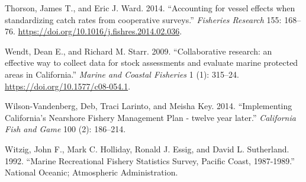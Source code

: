 \documentclass[11pt,
  english,
  a4paper,
]{article}
\newlength{\cslhangindent}
\newenvironment{CSLReferences}[2] %
 {%
  \setlength{\parindent}{0pt}
  \ifodd #1 \everypar{\setlength{\hangindent}{\cslhangindent}}\ignorespaces\fi
  \ifnum #2 > 0
  \setlength{\parskip}{#2\baselineskip}
  \fi
 }%
 {}
\begin{document}
\begin{CSLReferences}{1}{0}
\leavevmode{}%
Thorson, James T., and Eric J. Ward. 2014. {``{Accounting for vessel effects when standardizing catch rates from cooperative surveys}.''} \emph{Fisheries Research} 155: 168--76. \url{https://doi.org/10.1016/j.fishres.2014.02.036}.

\leavevmode{}%
Wendt, Dean E., and Richard M. Starr. 2009. {``{Collaborative research: an effective way to collect data for stock assessments and evaluate marine protected areas in California}.''} \emph{Marine and Coastal Fisheries} 1 (1): 315--24. \url{https://doi.org/10.1577/c08-054.1}.

\leavevmode{}%
Wilson-Vandenberg, Deb, Traci Larinto, and Meisha Key. 2014. {``{Implementing California's Nearshore Fishery Management Plan - twelve year later}.''} \emph{California Fish and Game} 100 (2): 186--214.

\leavevmode{}%
Witzig, John F., Mark C. Holliday, Ronald J. Essig, and David L. Sutherland. 1992. {``{Marine Recreational Fishery Statistics Survey, Pacific Coast, 1987-1989}.''} National Oceanic; Atmospheric Administration.

\end{CSLReferences}
\end{document}

